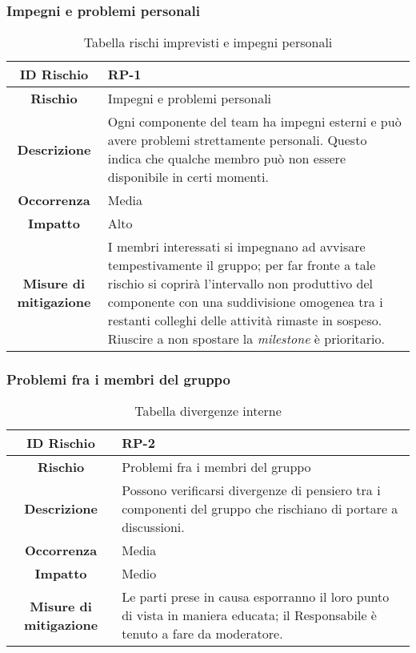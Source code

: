 \documentclass[10pt, a4paper]{article}
\begin{document}
\subsubsection{Impegni e problemi personali}
{\renewcommand{\arraystretch}{1.5}
\begin{table}[h]
\begin{tabularx}{\textwidth}{c|X}
\textbf{ID Rischio} & RP-1 \\
\hline
\textbf{Rischio} & Impegni e problemi personali\\
\hline
\textbf{Descrizione} & Ogni componente del team ha impegni esterni e può avere problemi strettamente personali. Questo indica che qualche membro può non essere disponibile in certi momenti.\\
\hline
\textbf{Occorrenza} & Media\\
\hline
\textbf{Impatto} & Alto\\
\hline
\textbf{Misure di mitigazione} & I membri interessati si impegnano ad avvisare tempestivamente il gruppo; per far fronte a tale rischio si coprirà l’intervallo non produttivo del componente con una suddivisione omogenea tra i restanti colleghi delle attività rimaste in sospeso.
Riuscire a non spostare la \textit{milestone} è prioritario.\\
\end{tabularx}
\caption{Tabella rischi imprevisti e impegni personali}
\end{table}}




\subsubsection{Problemi fra i membri del gruppo}

{\renewcommand{\arraystretch}{1.5}
\begin{table}[h]
\begin{tabularx}{\textwidth}{c|X}
\textbf{ID Rischio} & RP-2 \\
\hline
\textbf{Rischio} & Problemi fra i membri del gruppo  \\
\hline
\textbf{Descrizione} & Possono verificarsi divergenze di pensiero tra i componenti del gruppo che rischiano di portare a discussioni. \\
\hline
\textbf{Occorrenza} & Media\\
\hline
\textbf{Impatto} & Medio \\
\hline
\textbf{Misure di mitigazione} & Le parti prese in causa esporranno il loro punto di vista in maniera educata; il Responsabile è tenuto a fare da moderatore. \\
\end{tabularx}
\caption{Tabella divergenze interne}
\end{table}
}
\end{document}
